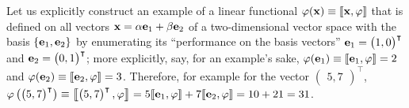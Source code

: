 {\color{blue}
\bexample
Let us explicitly construct an example of a linear functional $\varphi ({\bf x})\equiv \llbracket {\bf x},\varphi\rrbracket $ that is defined
on all vectors ${\bf x}=
\alpha {\bf e}_1
+
\beta {\bf e}_2
$
of a two-dimensional vector space with the basis $\{{\bf e}_1, {\bf e}_2 \}$
by enumerating its ``performance on the basis vectors''  ${\bf e}_1=\begin{pmatrix}1,0\end{pmatrix}^\intercal$
and ${\bf e}_2=\begin{pmatrix}0,1\end{pmatrix}^\intercal$;
more explicitly,  say, for an example's sake,
$\varphi ({\bf e}_1 ) \equiv \llbracket  {\bf e}_1,\varphi \rrbracket  = 2$ and
$\varphi ({\bf e}_2 ) \equiv \llbracket  {\bf e}_2,\varphi \rrbracket  = 3$.
Therefore, for example for the vector $\begin{pmatrix}5,7\end{pmatrix}^\intercal$,
$\varphi \left(\begin{pmatrix}5,7\end{pmatrix}^\intercal \right)
\equiv \left\llbracket \begin{pmatrix}5,7\end{pmatrix}^\intercal,
\varphi \right\rrbracket  = 5 \llbracket {\bf e}_1, \varphi \rrbracket  + 7 \llbracket  {\bf e}_2,\varphi \rrbracket
=10+21=31$.

}
